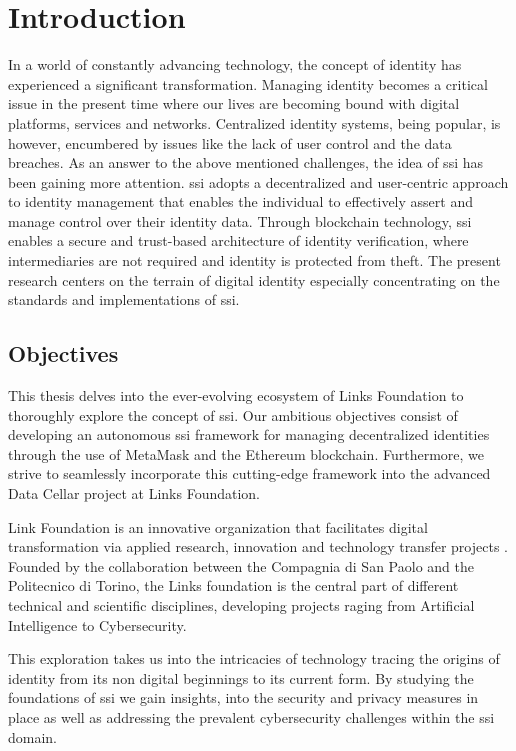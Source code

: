 \chapter{Introduction} \label{ch:introduction}

In a world of constantly advancing technology, the concept of identity has experienced a significant transformation. Managing identity becomes a critical issue in the 
present time where our lives are becoming bound with digital platforms, services and networks. Centralized identity systems, being popular, is however, encumbered by 
issues like the lack of user control and the data breaches. As an answer to the above mentioned challenges, the idea of \gls{ssi} has been gaining more attention. \gls{ssi} 
adopts a decentralized and user-centric approach to identity management that enables the individual to effectively assert and manage control over their identity data. 
Through blockchain technology, \gls{ssi} enables a secure and trust-based architecture of identity verification, where intermediaries are not required and identity is 
protected from theft. The present research centers on the terrain of digital identity especially concentrating on the standards and implementations of \gls{ssi}.

\section{Objectives} 

This thesis delves into the ever-evolving ecosystem of Links Foundation to thoroughly explore the concept of \gls{ssi}. Our ambitious objectives 
consist of developing an autonomous \gls{ssi} framework for managing decentralized identities through the use of MetaMask and the Ethereum blockchain. Furthermore, we strive to 
seamlessly incorporate this cutting-edge framework into the advanced Data Cellar project at Links Foundation.

Link Foundation is an innovative organization that facilitates digital transformation via applied research, innovation and technology transfer projects \cite{linksfoundation}.
Founded by the collaboration between the Compagnia di San Paolo and the Politecnico di Torino, the Links foundation is the central part of different technical and scientific 
disciplines, developing projects raging from Artificial Intelligence to Cybersecurity.

This exploration takes us into the intricacies of technology tracing the origins of identity from its non digital beginnings to its current form. By studying the foundations
of \gls{ssi} we gain insights, into the security and privacy measures in place as well as addressing the prevalent cybersecurity challenges within the \gls{ssi} domain.

